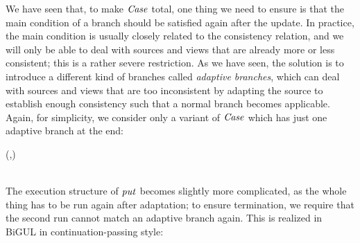 We have seen that, to make \ensuremath{\Conid{Case}} total, one thing we need to ensure is that the main condition of a branch should be satisfied again after the update.
In practice, the main condition is usually closely related to the consistency relation, and we will only be able to deal with sources and views that are already more or less consistent; this is a rather severe restriction.
As we have seen, the solution is to introduce a different kind of branches called \emph{adaptive branches}, which can deal with sources and views that are too inconsistent by adapting the source to establish enough consistency such that a normal branch becomes applicable.
Again, for simplicity, we consider only a variant of \ensuremath{\Conid{Case}} which has just one adaptive branch at the end:
\begin{hscode}\SaveRestoreHook
{}%
%
%
\>[B]{}\;\;\;\mathrel{=}(\to {}\to {},\to {}\to {}){}\<[E]%
\\[\blanklineskip]%
\>[B]{}\mathbin{::}{}\<[10]%
\>[10]{}\;\;\to {}\;\;\to {}\<[E]%
\\
\>[10]{}\;\;\to {}\;\;\<[E]%
\ColumnHook
\end{hscode}\resethooks
The execution structure of \ensuremath{\Varid{put}} becomes slightly more complicated, as the whole thing has to be run again after adaptation; to ensure termination, we require that the second run cannot match an adaptive branch again.
This is realized in BiGUL in continuation-passing style:

